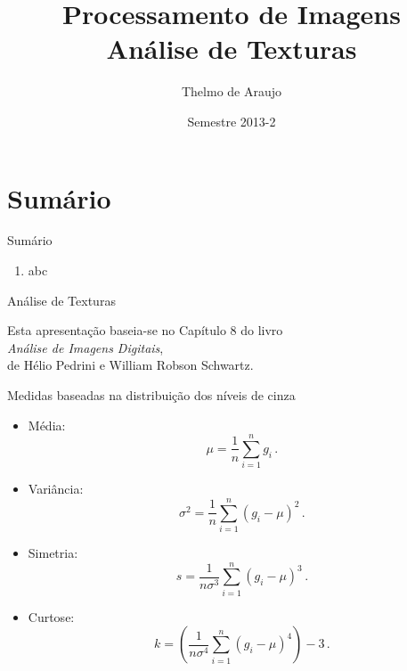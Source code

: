 \documentclass[compress]{beamer}
\title{Processamento de Imagens\\Análise de Texturas}
\author{Thelmo de Araujo}
\date{Semestre 2013-2}
\begin{document}
\frame{\titlepage}

\section{Sumário}

\begin{frame}{Sumário}
\begin{enumerate}
\item<+->{abc}
\end{enumerate}
\end{frame}

\begin{frame}{\tableofcontents}
\end{frame}

\begin{frame}{Análise de Texturas}
\begin{center}
Esta apresentação baseia-se no Capítulo 8 do livro  \cite{Pedrini}\\
\textit{Análise de Imagens Digitais},\\
de Hélio Pedrini e William Robson Schwartz.
\end{center}
\end{frame}

\begin{frame}{Medidas baseadas na distribuição dos níveis de cinza}


\begin{itemize}
\vfill \item<+->{Média:
\begin{equation*}
 \mu = \frac{1}{n} \sum_{i = 1}^{n} g_i \, .
\end{equation*}
}

\vfill \item<+->{Variância:
\begin{equation*}
 \sigma^2 = \frac{1}{n} \sum_{i = 1}^{n} (g_i - \mu)^2 \, .
\end{equation*}
}

\vfill \item<+->{Simetria:
\begin{equation*}
 s = \frac{1}{n \sigma^3} \sum_{i = 1}^{n} (g_i - \mu)^3 \, .
\end{equation*}
}

\vfill \item<+->{Curtose:
\begin{equation*}
 k = \left(\frac{1}{n \sigma^4} \sum_{i = 1}^{n} (g_i - \mu)^4 \right) - 3 \, .
\end{equation*}
}
\end{itemize}
\end{frame}
\end{document}
